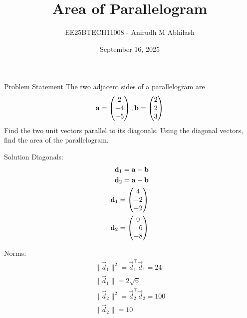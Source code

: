 \documentclass{beamer}
\title{Area of Parallelogram}
\author{EE25BTECH11008 - Anirudh M Abhilash}
\date{September 16, 2025}
\begin{document}
\begin{frame}
\titlepage
\end{frame}

\begin{frame}{Problem Statement}
The two adjacent sides of a parallelogram are 
\begin{align*}
\mathbf{a} = \begin{pmatrix}2 \\ -4 \\ -5\end{pmatrix},  
\mathbf{b} = \begin{pmatrix}2 \\ 2 \\ 3\end{pmatrix}
\end{align*}
Find the two unit vectors parallel to its diagonals. Using the diagonal vectors, find the area of the parallelogram.
\end{frame}

\begin{frame}{Solution}
Diagonals:
\begin{align}
\mathbf{d}_1 = \mathbf{a} + \mathbf{b} \\
\mathbf{d}_2 = \mathbf{a} - \mathbf{b} \\
\mathbf{d}_1 = \begin{pmatrix}4 \\ -2 \\ -2\end{pmatrix} \\ 
\mathbf{d}_2 = \begin{pmatrix}0 \\ -6 \\ -8\end{pmatrix} 
\end{align}

Norms:
\begin{align}
\|\vec{d}_1\|^2 = \vec{d}_1^\top \vec{d}_1 = 24 \\
\|\vec{d}_1\| = 2\sqrt{6} \\
\|\vec{d}_2\|^2 = \vec{d}_2^\top \vec{d}_2 = 100 \\
\|\vec{d}_2\| = 10
\end{align}
\end{frame}
\end{document}
